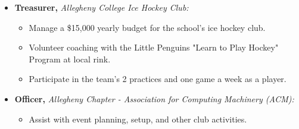 \documentclass[11pt,a4paper,sans]{moderncv}
\begin{document}
\begin{itemize} %
\item \textbf{Treasurer,} \textit{Allegheny College Ice Hockey Club:}
\begin{itemize} %
  \item Manage a \$15,000 yearly budget for the school's ice hockey club.
  \item Volunteer coaching with the Little Penguins "Learn to Play Hockey" Program at local rink.
  \item Participate in the team's 2 practices and one game a week as a player.
\end{itemize} %

\vspace{2pt}

\item \textbf{Officer,} \textit{Allegheny Chapter - Association for Computing Machinery (ACM): }
\begin{itemize} %
  \item Assist with event planning, setup, and other club activities.
\end{itemize} %
\end{itemize} %
\end{document}
